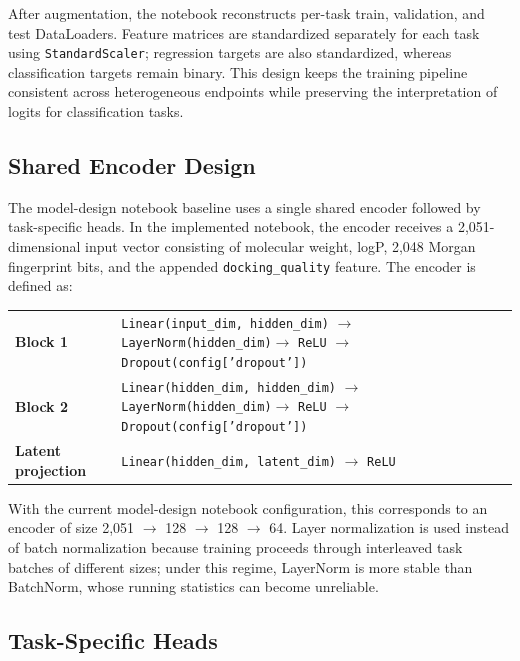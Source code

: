 \documentclass[a4paper,11pt,twoside]{report}
\begin{document}
After augmentation, the notebook reconstructs per-task train, validation, and test DataLoaders. Feature matrices are standardized separately for each task using \texttt{StandardScaler}; regression targets are also standardized, whereas classification targets remain binary. This design keeps the training pipeline consistent across heterogeneous endpoints while preserving the interpretation of logits for classification tasks.

\subsection{Shared Encoder Design}

The model-design notebook baseline uses a single shared encoder followed by task-specific heads. In the implemented notebook, the encoder receives a 2,051-dimensional input vector consisting of molecular weight, logP, 2,048 Morgan fingerprint bits, and the appended \texttt{docking\_quality} feature. The encoder is defined as:

\begin{center}
\small
\begin{tabular}{@{}p{}p{}@{}}
\textbf{Block 1} & \texttt{Linear(input\_dim, hidden\_dim)} $\rightarrow$ \texttt{LayerNorm(hidden\_dim)}\newline $\rightarrow$ \texttt{ReLU} $\rightarrow$ \texttt{Dropout(config['dropout'])} \\
\textbf{Block 2} & \texttt{Linear(hidden\_dim, hidden\_dim)} $\rightarrow$ \texttt{LayerNorm(hidden\_dim)}\newline $\rightarrow$ \texttt{ReLU} $\rightarrow$ \texttt{Dropout(config['dropout'])} \\
\textbf{Latent projection} & \texttt{Linear(hidden\_dim, latent\_dim)} $\rightarrow$ \texttt{ReLU}
\end{tabular}
\normalsize
\end{center}

With the current model-design notebook configuration, this corresponds to an encoder of size 2,051 $\rightarrow$ 128 $\rightarrow$ 128 $\rightarrow$ 64. Layer normalization is used instead of batch normalization because training proceeds through interleaved task batches of different sizes; under this regime, LayerNorm is more stable than BatchNorm, whose running statistics can become unreliable.

\subsection{Task-Specific Heads}
\end{document}
